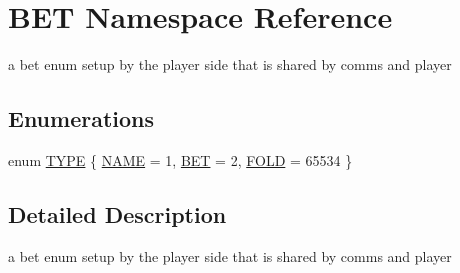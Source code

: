 \hypertarget{namespaceBET}{\section{B\-E\-T Namespace Reference}
\label{namespaceBET}
}


a bet enum setup by the player side that is shared by comms and player  


\subsection*{Enumerations}
\begin{DoxyCompactItemize}
\item 
enum \hyperlink{namespaceBET_ac53dea9da5d253fe318a94e39406f866}{T\-Y\-P\-E} \{ \hyperlink{namespaceBET_ac53dea9da5d253fe318a94e39406f866a09f4f61481b3a5161c54018c248021eb}{N\-A\-M\-E} = 1, 
\hyperlink{namespaceBET_ac53dea9da5d253fe318a94e39406f866a1210d30e425edb9c60391107b1ad4e27}{B\-E\-T} = 2, 
\hyperlink{namespaceBET_ac53dea9da5d253fe318a94e39406f866abddb7128262c2b4c052bce2a39502100}{F\-O\-L\-D} = 65534
 \}
\end{DoxyCompactItemize}


\subsection{Detailed Description}
a bet enum setup by the player side that is shared by comms and player 

